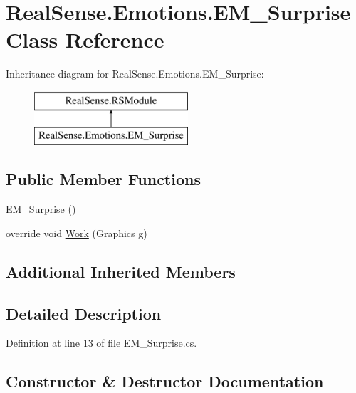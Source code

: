\hypertarget{class_real_sense_1_1_emotions_1_1_e_m___surprise}{}\section{Real\+Sense.\+Emotions.\+E\+M\+\_\+\+Surprise Class Reference}
\label{class_real_sense_1_1_emotions_1_1_e_m___surprise}
Inheritance diagram for Real\+Sense.\+Emotions.\+E\+M\+\_\+\+Surprise\+:\begin{figure}[H]
\begin{center}
\leavevmode
\includegraphics[height=2.000000cm]{class_real_sense_1_1_emotions_1_1_e_m___surprise}
\end{center}
\end{figure}
\subsection*{Public Member Functions}
\begin{DoxyCompactItemize}
\item 
\hyperlink{class_real_sense_1_1_emotions_1_1_e_m___surprise_a95c89a129f31134f35b0d34a212e7d29}{E\+M\+\_\+\+Surprise} ()
\item 
override void \hyperlink{class_real_sense_1_1_emotions_1_1_e_m___surprise_a08040934bb081596a4b02b483dc3a662}{Work} (Graphics g)
\end{DoxyCompactItemize}
\subsection*{Additional Inherited Members}


\subsection{Detailed Description}


Definition at line 13 of file E\+M\+\_\+\+Surprise.\+cs.



\subsection{Constructor \& Destructor Documentation}
\mbox{\label{class_real_sense_1_1_emotions_1_1_e_m___surprise_a95c89a129f31134f35b0d34a212e7d29}} 

